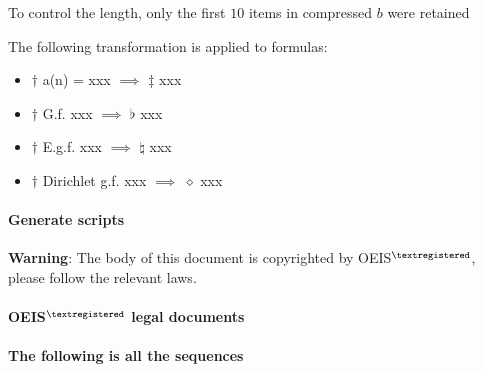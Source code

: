 \documentclass{oeiscommon}
\begin{document}
To control the length, only the first \(10\) items in compressed \(b\) were retained

The following transformation is applied to formulas:

\begin{itemize}
    \item \(\dagger\) a(n) = xxx \(\implies\) \(\ddagger\) xxx 
    \item \(\dagger\) G.f. xxx \(\implies\) \(\flat\) xxx 
    \item \(\dagger\) E.g.f. xxx \(\implies\) \(\natural\) xxx 
    \item \(\dagger\) Dirichlet g.f. xxx \(\implies\) \(\diamond\) xxx 
\end{itemize}

\paragraph{Generate scripts} \href{\repo}{\repo}

\textbf{Warning}: The body of this document is copyrighted by OEIS{\(^{\textregistered}\)}, please follow the relevant laws.

\paragraph{OEIS{\(^{\textregistered}\)} legal documents} \href{\oeislegaldoc}{\oeislegaldoc}

\paragraph{The following is all the sequences}

\newpage
\linespread{1.0}
\twocolumn
\footnotesize
\setcounter{page}{1}
\pagestyle{fancy}
\fancyhf{}
\fancyfoot[LE,RO]{\thepage}



\footnotesize
\setcounter{page}{1}
\pagestyle{fancy}
\fancyhf{}
\fancyfoot[C]{\thepage}
\printindex
\end{document}
